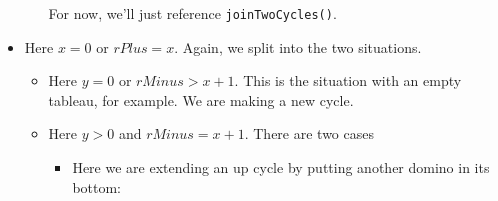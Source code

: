 \documentclass[12pt]{article}
\numberwithin{equation}{section}
\newcommand{\verticalDominoMaybe}[3]{\filldraw [dominoMaybeStyle] (#2 - 1 + \eps,  #1 - 1 + \eps) rectangle + (1 - \teps,2 -\teps) node [dominoText] {$#3$};}
\newcommand{\horizontalDominoMaybeShift}[4]{\filldraw [dominoMaybeStyle] (#2 - 1 + #4 + \eps, #1 - 1 + \eps) rectangle + (2 - \teps, 1 -\teps) node [dominoText] {$#3$};}
\newcommand{\verticalDominoMaybeShift}[4]{\filldraw [dominoMaybeStyle] (#2 - 1 + #4 + \eps,  #1 - 1 + \eps) rectangle + (1 - \teps,2 -\teps) node [dominoText] {$#3$};}
\begin{document}
\begin{itemize}
\begin{itemize}
\begin{figure}[H]
      \end{figure}
      For now, we'll just reference \texttt{joinTwoCycles()}.
    \end{itemize}
    \item Here $x = 0$ or $rPlus = x$.
    Again, we split into the two situations.
    \begin{itemize}
      \item Here $y = 0$ or $rMinus > x + 1$.
      This is the situation with an empty tableau, for example.
      We are making a new cycle.
      \begin{figure}[H]
        \centering
      \end{figure}

      \begin{figure}[H]
        \centering
      \end{figure}
      \item Here $y > 0$ and $rMinus = x + 1$.
      There are two cases
      \begin{itemize}
        \item Here we are extending an up cycle by putting another domino in its bottom:
        \begin{figure}[H]
          \centering
\end{figure}
\end{itemize}
\end{itemize}
\end{itemize}
\end{document}
